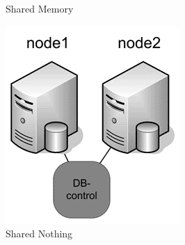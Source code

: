 \begin{figure}[h]
\begin{subfigure}[b]{0.2\textwidth}
		\caption{Shared Memory}
		\label{fig:my_label2}
	\end{subfigure}
	\hfill
	\begin{subfigure}[b]{0.2\textwidth}
		\includegraphics[width=\textwidth]{7/07_03.png}
		\caption{Shared Nothing}
		\label{fig:my_label3}
	\end{subfigure}
	\hfill
	\begin{subfigure}[b]{0.2\textwidth}

\end{subfigure}
\end{figure}
